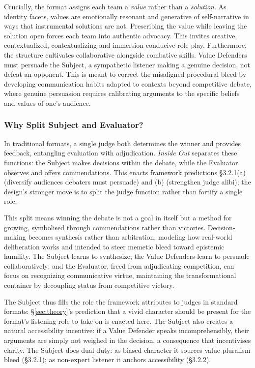 Crucially, the format assigns each team a \textit{value} rather than a \textit{solution}. As identity facets, values are emotionally resonant and generative of self-narrative in ways that instrumental solutions are not. Prescribing the value while leaving the solution open forces each team into authentic advocacy. This invites creative, contextualized, contextualizing and immersion-conducive role-play. Furthermore, the structure cultivates collaborative alongside combative skills. Value Defenders must persuade the Subject, a sympathetic listener making a genuine decision, not defeat an opponent. This is meant to correct the misaligned procedural bleed by developing communication habits adapted to contexts beyond competitive debate, where genuine persuasion requires calibrating arguments to the specific beliefs and values of one's audience.

\subsubsection{Why Split Subject and Evaluator?}

In traditional formats, a single judge both determines the winner and provides feedback, entangling evaluation with adjudication. \emph{Inside Out} separates these functions: the Subject makes decisions within the debate, while the Evaluator observes and offers commendations. This enacts framework predictions §3.2.1(a) (diversify audiences debaters must persuade) and (b) (strengthen judge alibi); the design's stronger move is to split the judge function rather than fortify a single role.

This split means winning the debate is not a goal in itself but a method for growing, symbolised through commendations rather than victories. Decision-making becomes synthesis rather than arbitration, modeling how real-world deliberation works and intended to steer memetic bleed toward epistemic humility. The Subject learns to synthesize; the Value Defenders learn to persuade collaboratively; and the Evaluator, freed from adjudicating competition, can focus on recognizing communicative virtue, maintaining the transformational container by decoupling status from competitive victory.

The Subject thus fills the role the framework attributes to judges in standard formats: \S\ref{sec:theory}'s prediction that a vivid character should be present for the format's listening role to take on is enacted here. The Subject also creates a natural accessibility incentive: if a Value Defender speaks incomprehensibly, their arguments are simply not weighed in the decision, a consequence that incentivises clarity. The Subject does dual duty: as biased character it sources value-pluralism bleed (§3.2.1); as non-expert listener it anchors accessibility (§3.2.2).

